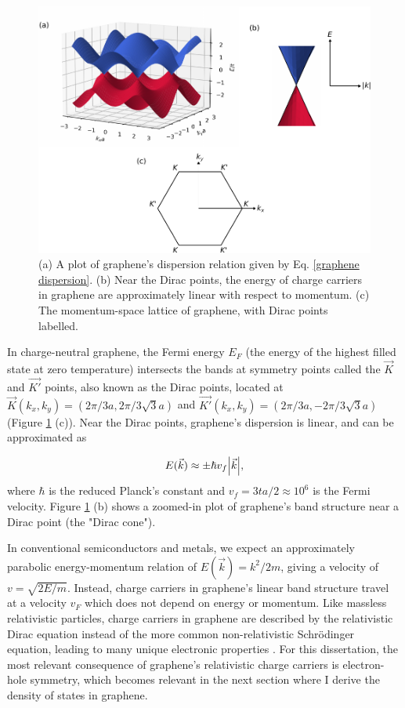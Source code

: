 \documentclass[double,12pt,1in]{beavtex}
\begin{document}
\begin{figure}
    \includegraphics{Graphene band structure 3D.pdf}
    \caption{(a) A plot of graphene's dispersion relation given by Eq. \ref{graphene dispersion}. (b) Near the Dirac points, the energy of charge carriers in graphene are approximately linear with respect to momentum. (c) The momentum-space lattice of graphene, with Dirac points labelled.}
    \label{graphene dispersion plot}
\end{figure}
In charge-neutral graphene, the Fermi energy $E_F$ (the energy of the highest filled state at zero temperature) intersects the bands at symmetry points called the $\vec{K}$ and $\vec{K'}$ points, also known as the Dirac points, located at $\vec{K}(k_x, k_y) = (2\pi/3a, 2\pi/3\sqrt{3}a)$ and $\vec{K'}(k_x, k_y) = (2\pi/3a, -2\pi/3\sqrt{3}a)$ (Figure \ref{graphene dispersion plot} (c)). Near the Dirac points, graphene's dispersion is linear, and can be approximated as

\begin{equation}
    E(\vec{k}) \approx \pm \hbar v_f \abs{\vec{k}}, \label{linear dispersion of graphene}
\end{equation}
where $\hbar$ is the reduced Planck's constant and $v_f = 3ta/2  \approx 10^6$ is the Fermi velocity. Figure \ref{graphene dispersion plot} (b) shows a zoomed-in plot of graphene's band structure near a Dirac point (the "Dirac cone").

In conventional semiconductors and metals, we expect an approximately parabolic energy-momentum relation of $E(\vec{k}) = k^2/2m$, giving a velocity of $v = \sqrt{2E/m}$. Instead, charge carriers in graphene's linear band structure travel at a velocity $v_F$ which does not depend on energy or momentum. Like massless relativistic particles, charge carriers in graphene are described by the relativistic Dirac equation instead of the more common non-relativistic Schrödinger equation, leading to many unique electronic properties \cite{castro_neto_electronic_2009}. For this dissertation, the most relevant consequence of graphene's relativistic charge carriers is electron-hole symmetry, which becomes relevant in the next section where I derive the density of states in graphene.
\end{document}
